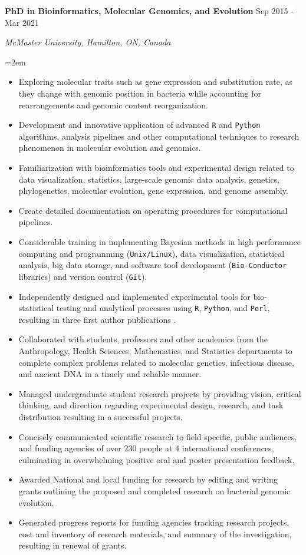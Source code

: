 \documentclass[paper=a4,fontsize=11pt]{scrartcl}	 			%
\newcommand{\EducationEntry}[4]{
		\noindent \textbf{#1} \hfill 					%
		\colorbox{White}{%
			\parbox{10em}{%
			\hfill\color{Black}#2}} \par				%
		\noindent \textit{#3} \par					%
		\noindent\hangindent=2em\hangafter=0 \small #4 	%
		\normalsize \par}
\newcommand{\WorkEntry}[4]{						%
		\noindent \textbf{#1} \hfill 					%
		\colorbox{White}{\color{Black}#2} \par		%
		\noindent \textit{#3} \par					%
		\noindent\hangindent=2em\hangafter=0 \small #4 	%
		\normalsize \par}
\begin{document}
\WorkEntry{PhD in Bioinformatics, Molecular Genomics, and Evolution}{Sep 2015 - Mar 2021}{McMaster University, Hamilton, ON, Canada}{
	\begin{itemize}
		\item  Exploring molecular traits such as gene expression and substitution rate, as they change with genomic position in bacteria while accounting for rearrangements and genomic content reorganization.
		\item Development and innovative application of advanced \texttt{R} and \texttt{Python} algorithms, analysis pipelines and other computational techniques to research phenomenon in molecular evolution and genomics.
		\item Familiarization with bioinformatics tools and experimental design related to data visualization, statistics, large-scale genomic data analysis, genetics, phylogenetics, molecular evolution, gene expression, and genome assembly.
		\item Create detailed documentation on operating procedures for computational pipelines.
		\item Considerable training in implementing Bayesian methods in high performance computing and programming (\texttt{Unix/Linux}), data visualization, statistical analysis, big data storage, and software tool development (\texttt{Bio-Conductor} libraries) and version control (\texttt{Git}).
		\item Independently designed and implemented experimental tools for bio-statistical testing and analytical processes using \texttt{R}, \texttt{Python}, and \texttt{Perl}, resulting in three first author publications \cite{Lat:20,Lato:21,LatoD:20}.
		\item Collaborated with students, professors and other academics from the Anthropology, Health Sciences, Mathematics, and Statistics departments to complete complex problems related to molecular genetics, infectious disease, and ancient DNA in a timely and reliable manner. 
		\item Managed undergraduate student research projects by providing vision, critical thinking, and direction regarding experimental design, research, and task distribution resulting in a successful projects.
		\item Concisely communicated scientific research to field specific, public audiences, and funding agencies of over 230 people at 4 international conferences, culminating in overwhelming positive oral and poster presentation feedback.
		\item Awarded National and local funding for research by editing and writing grants outlining the proposed and completed research on bacterial genomic evolution.
		\item Generated progress reports for funding agencies tracking research projects, cost and inventory of research materials, and summary of the investigation, resulting in renewal of grants.
\end{itemize}}
\end{document}
